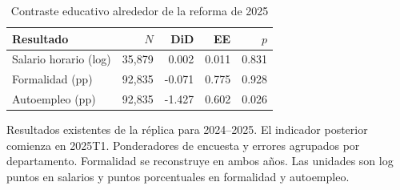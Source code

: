 \begin{table}[!htbp]\centering
\caption{Contraste educativo alrededor de la reforma de 2025}\label{tab:short_2025}
\begin{threeparttable}\small
\setlength{\tabcolsep}{4pt}
\begin{tabular}{lrrrr}
\toprule
Resultado & $N$ & DiD & EE & $p$ \\
\midrule
Salario horario (log) & 35,879 & 0.002 & 0.011 & 0.831 \\
Formalidad (pp) & 92,835 & -0.071 & 0.775 & 0.928 \\
Autoempleo (pp) & 92,835 & -1.427 & 0.602 & 0.026 \\
\bottomrule
\end{tabular}
\begin{tablenotes}\footnotesize
\item Resultados existentes de la réplica para 2024--2025. El indicador posterior comienza en 2025T1. Ponderadores de encuesta y errores agrupados por departamento. Formalidad se reconstruye en ambos años. Las unidades son log puntos en salarios y puntos porcentuales en formalidad y autoempleo.
\end{tablenotes}
\end{threeparttable}\end{table}
